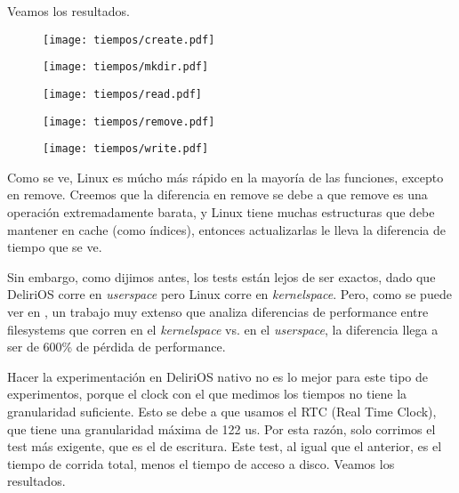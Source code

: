 Veamos los resultados.


\begin{figure}[H]
  \centering
  \begin{minipage}[b]{0.49\textwidth}
    \texttt{[image: tiempos/create.pdf]}
    \caption{}
  \end{minipage}
  \begin{minipage}[b]{0.49\textwidth}
    \texttt{[image: tiempos/mkdir.pdf]}
    \caption{}
  \end{minipage}
  \hfill
\end{figure}
\begin{figure}[H]
  \centering
  \begin{minipage}[b]{0.49\textwidth}
    \texttt{[image: tiempos/read.pdf]}
    \caption{}
  \end{minipage}
  \begin{minipage}[b]{0.49\textwidth}
    \texttt{[image: tiempos/remove.pdf]}
    \caption{}
  \end{minipage}
\end{figure}
\begin{figure}[H]
  \centering
  \texttt{[image: tiempos/write.pdf]}
  \caption{}
\end{figure}

Como se ve, Linux es múcho más rápido en la mayoría de las funciones, excepto en remove. Creemos que la diferencia en remove se debe a que remove es una operación extremadamente barata, y Linux tiene muchas estructuras que debe mantener en cache (como índices), entonces actualizarlas le lleva la diferencia de tiempo que se ve.

Sin embargo, como dijimos antes, los tests están lejos de ser exactos, dado que DeliriOS corre en \emph{userspace} pero Linux corre en \emph{kernelspace}. Pero, como se puede ver en \cite{Rajgarhia:2010:PEU:1774088.1774130}, un trabajo muy extenso que analiza diferencias de performance entre filesystems que corren en el \emph{kernelspace} vs. en el \emph{userspace}, la diferencia llega a ser de 600\% de pérdida de performance.

Hacer la experimentación en DeliriOS nativo no es lo mejor para este tipo de experimentos, porque el clock con el que medimos los tiempos no tiene la granularidad suficiente.
Esto se debe a que usamos el RTC (Real Time Clock), que tiene una granularidad máxima de 122 us.
Por esta razón, solo corrimos el test más exigente, que es el de escritura. Este test, al igual que el anterior, es el tiempo de corrida total, menos el tiempo de acceso a disco.
Veamos los resultados.

